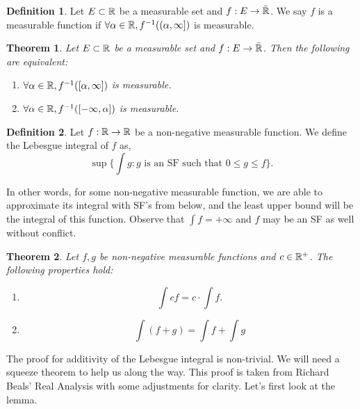 \documentclass{article}
\newtheorem{theorem}{Theorem}
\theoremstyle{axiom} \newtheorem{axiom}{Axiom}
\theoremstyle{definition} \newtheorem{definition}{Definition}
\theoremstyle{example} \newtheorem{example}{Example}
\theoremstyle{proposition} \newtheorem{prop}{Proposition}
\theoremstyle{lemma} \newtheorem{lemma}{Lemma}
\begin{document}
\begin{definition}
	Let $E\subset \mathbb{R}$ be a measurable set and $f:E\rightarrow \bar{\mathbb{R}}$. We say $f$ is a 
	measurable function if $\forall \alpha \in \mathbb{R}, f^{-1}((\alpha,\infty])$ is measurable.
\end{definition}

\begin{theorem}
	Let $E \subset \mathbb{R}$ be a measurable set and $f:E \rightarrow \bar{\mathbb{R}}$. Then the
	following are equivalent:
	\begin{enumerate}
		\item $\forall \alpha \in \mathbb{R}, f^{-1}([\alpha,\infty])$ is measurable.
		\item $\forall \alpha \in \mathbb{R}, f^{-1}([-\infty,\alpha])$ is measurable.
	\end{enumerate}
\end{theorem}

\begin{definition}
	Let $f:\mathbb{R} \rightarrow \mathbb{R}$ be a non-negative measurable function. We define
	the Lebesgue integral of $f$ as,
	\begin{equation}
		\sup \bigg\{ \int g : g \text{ is an SF such that } 0 \leq g \leq f\bigg\}.
	\end{equation}
\end{definition}

In other words, for some non-negative measurable function, we are able to
approximate its integral with SF's from below, and the least upper bound
will be the integral of this function. Observe that $\int f = +\infty$ and 
$f$ may be an SF as well without conflict.

\begin{theorem}
	Let $f,g$ be non-negative measurable functions and $c \in \mathbb{R}^{+}$. The 
	following properties hold:
	\begin{enumerate}
		\item 
			\begin{equation}
				\int cf = c\cdot \int f.
			\end{equation}
		\item 
			\begin{equation}
				\int (f + g) = \int f + \int g
			\end{equation}
		\end{enumerate}
\end{theorem}

The proof for additivity of the Lebesgue integral is non-trivial. We will
need a squeeze theorem to help us along the way. This proof is taken from
Richard Beals' Real Analysis with some adjustments for clarity. Let's first look at the 
lemma.
\end{document}
